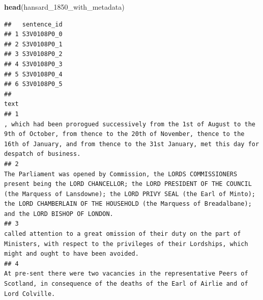 \documentclass[
]{article}
\newenvironment{Shaded}{\begin{snugshade}}{\end{snugshade}}
\newcommand{\FunctionTok}[1]{\textcolor[rgb]{0.13,0.29,0.53}{\textbf{#1}}}
\newcommand{\NormalTok}[1]{#1}
\begin{document}
\begin{Shaded}
\begin{Highlighting}[]
\FunctionTok{head}\NormalTok{(hansard\_1850\_with\_metadata)}
\end{Highlighting}
\end{Shaded}

\begin{verbatim}
##   sentence_id
## 1 S3V0108P0_0
## 2 S3V0108P0_1
## 3 S3V0108P0_2
## 4 S3V0108P0_3
## 5 S3V0108P0_4
## 6 S3V0108P0_5
##                                                                                                                                                                                                                                                                                                                                                                                                                                                          text
## 1                                                                                                                                                                                                                       , which had been prorogued successively from the 1st of August to the 9th of October, from thence to the 20th of November, thence to the 16th of January, and from thence to the 31st January, met this day for despatch of business.
## 2                                                                                                                                             The Parliament was opened by Commission, the LORDS COMMISSIONERS present being the LORD CHANCELLOR; the LORD PRESIDENT OF THE COUNCIL (the Marquess of Lansdowne); the LORD PRIVY SEAL (the Earl of Minto); the LORD CHAMBERLAIN OF THE HOUSEHOLD (the Marquess of Breadalbane); and the LORD BISHOP OF LONDON.
## 3                                                                                                                                                                                                                                                                                 called attention to a great omission of their duty on the part of Ministers, with respect to the privileges of their Lordships, which might and ought to have been avoided.
## 4                                                                                                                                                                                                                                                                                                      At pre-sent there were two vacancies in the representative Peers of Scotland, in consequence of the deaths of the Earl of Airlie and of Lord Colville.

\end{verbatim}
\end{document}
